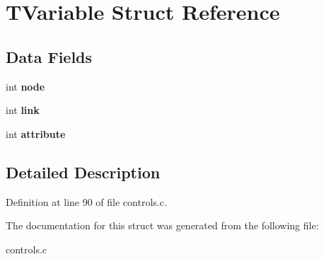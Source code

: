 \hypertarget{struct_t_variable}{}\section{T\+Variable Struct Reference}
\label{struct_t_variable}
\subsection*{Data Fields}
\begin{DoxyCompactItemize}
\item 
\mbox{\label{struct_t_variable_af3fd9d829538e36331bf4a6fe7e6b7bc}} 
int {\bfseries node}
\item 
\mbox{\label{struct_t_variable_af203a1810ce3b44e2b2219c63e0ceff9}} 
int {\bfseries link}
\item 
\mbox{\label{struct_t_variable_a5a0a2be2e5e4bc3d94d8425f9a7e7919}} 
int {\bfseries attribute}
\end{DoxyCompactItemize}


\subsection{Detailed Description}


Definition at line 90 of file controls.\+c.



The documentation for this struct was generated from the following file\+:\begin{DoxyCompactItemize}
\item 
controls.\+c\end{DoxyCompactItemize}
